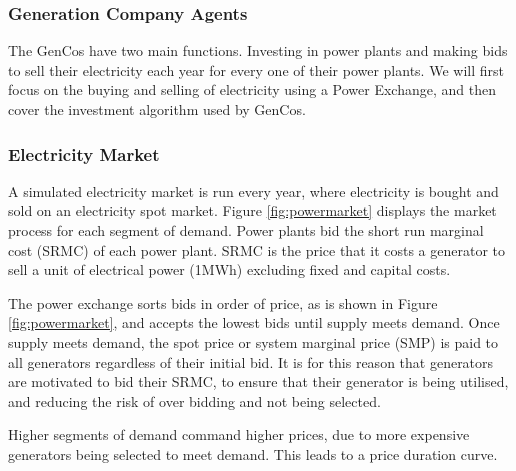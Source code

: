\subsubsection{Generation Company Agents} The GenCos have two main functions. Investing in power plants and making bids to sell their electricity each year for every one of their power plants. We will first focus on the buying and selling of electricity using a Power Exchange, and then cover the investment algorithm used by GenCos.

\subsubsection{Electricity Market} \label{sssec:electricity_market} A simulated electricity market is run every year, where electricity is bought and sold on an electricity spot market. Figure \ref{fig:powermarket} displays the market process for each segment of demand. Power plants bid the short run marginal cost (SRMC) of each power plant. SRMC is the price that it costs a generator to sell a unit of electrical power (1MWh) excluding fixed and capital costs. 

The power exchange sorts bids in order of price, as is shown in Figure \ref{fig:powermarket}, and accepts the lowest bids until supply meets demand. Once supply meets demand, the spot price or system marginal price (SMP) is paid to all generators regardless of their initial bid. It is for this reason that generators are motivated to bid their SRMC, to ensure that their generator is being utilised, and reducing the risk of over bidding and not being selected.

Higher segments of demand command higher prices, due to more expensive generators being selected to meet demand. This leads to a price duration curve.
 

